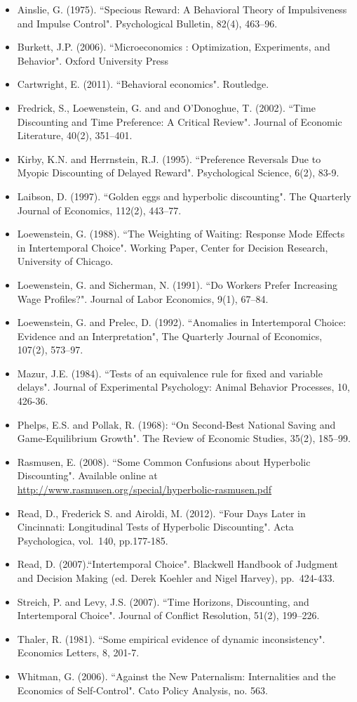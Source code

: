 \documentclass[]{article}
\begin{document}
\begin{itemize}
\item
  Ainslie, G. (1975). ``Specious Reward: A Behavioral Theory of Impulsiveness and Impulse Control". Psychological Bulletin, 82(4), 463--96.
\item
  Burkett, J.P. (2006). ``Microeconomics : Optimization, Experiments, and Behavior". Oxford University Press
\item
  Cartwright, E. (2011). ``Behavioral economics". Routledge.
\item
  Fredrick, S., Loewenstein, G. and and O'Donoghue, T. (2002). ``Time Discounting and Time Preference: A Critical Review". Journal of Economic Literature, 40(2), 351--401.
\item
  Kirby, K.N. and Herrnstein, R.J. (1995). ``Preference Reversals Due to Myopic Discounting of Delayed Reward". Psychological Science, 6(2), 83-9.
\item
  Laibson, D. (1997). ``Golden eggs and hyperbolic discounting". The Quarterly Journal of Economics, 112(2), 443--77.
\item
  Loewenstein, G. (1988). ``The Weighting of Waiting: Response Mode Effects in Intertemporal Choice". Working Paper, Center for Decision Research, University of Chicago.
\item
  Loewenstein, G. and Sicherman, N. (1991). ``Do Workers Prefer Increasing Wage Profiles?". Journal of Labor Economics, 9(1), 67--84.
\item
  Loewenstein, G. and Prelec, D. (1992). ``Anomalies in Intertemporal Choice: Evidence and an Interpretation", The Quarterly Journal of Economics, 107(2), 573--97.
\item
  Mazur, J.E. (1984). ``Tests of an equivalence rule for fixed and variable delays". Journal of Experimental Psychology: Animal Behavior Processes, 10, 426-36.
\item
  Phelps, E.S. and Pollak, R. (1968): ``On Second-Best National Saving and Game-Equilibrium Growth". The Review of Economic Studies, 35(2), 185--99.
\item
  Rasmusen, E. (2008). ``Some Common Confusions about Hyperbolic Discounting". Available online at \url{http://www.rasmusen.org/special/hyperbolic-rasmusen.pdf}
\item
  Read, D., Frederick S. and Airoldi, M. (2012). ``Four Days Later in Cincinnati: Longitudinal Tests of Hyperbolic Discounting". Acta Psychologica, vol.~140, pp.177-185.
\item
  Read, D. (2007).``Intertemporal Choice". Blackwell Handbook of Judgment and Decision Making (ed. Derek Koehler and Nigel Harvey), pp.~424-433.
\item
  Streich, P. and Levy, J.S. (2007). ``Time Horizons, Discounting, and Intertemporal Choice". Journal of Conflict Resolution, 51(2), 199--226.
\item
  Thaler, R. (1981). ``Some empirical evidence of dynamic inconsistency". Economics Letters, 8, 201-7.
\item
  Whitman, G. (2006). ``Against the New Paternalism: Internalities and the Economics of Self-Control". Cato Policy Analysis, no. 563.
\end{itemize}
\end{document}
